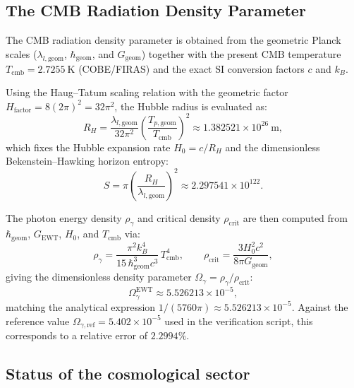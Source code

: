 \documentclass[10pt,a4paper]{article}
\begin{document}
\subsection{The CMB Radiation Density Parameter}
\label{sec:omega_gamma_cmb}

The CMB radiation density parameter is obtained from the geometric Planck scales ($\lambda_{l,\text{geom}}$, $\hbar_{\text{geom}}$, and $G_{\text{geom}}$) together with the present CMB temperature $T_{\text{cmb}} = 2.7255\ \text{K}$ (COBE/FIRAS) and the exact SI conversion factors $c$ and $k_B$.

Using the Haug--Tatum scaling relation with the geometric factor $H_{\text{factor}} = 8(2\pi)^2 = 32\pi^2$, the Hubble radius is evaluated as:
\begin{equation}
	R_H = \frac{\lambda_{l,\text{geom}}}{32\pi^2} \left(\frac{T_{p,\text{geom}}}{T_{\text{cmb}}}\right)^2 \approx 1.382521 \times 10^{26}\ \text{m},
	\label{eq:R_H_ewt}
\end{equation}
which fixes the Hubble expansion rate $H_0 = c / R_H$ and the dimensionless Bekenstein--Hawking horizon entropy:
\begin{equation}
	S = \pi \left(\frac{R_H}{\lambda_{l,\text{geom}}}\right)^2 \approx 2.297541 \times 10^{122}.
	\label{eq:S_hubble_ewt}
\end{equation}

The photon energy density $\rho_\gamma$ and critical density $\rho_{\text{crit}}$ are then computed from $\hbar_{\text{geom}}$, $G_{\text{EWT}}$, $H_0$, and $T_{\text{cmb}}$ via:
\begin{equation}
	\rho_\gamma = \frac{\pi^2 k_B^4}{15\,\hbar_{\text{geom}}^3 c^3}\,T_{\text{cmb}}^4,
	\qquad
	\rho_{\text{crit}} = \frac{3 H_0^2 c^2}{8\pi G_{\text{geom}}},
	\label{eq:rho_gamma_crit}
\end{equation}
giving the dimensionless density parameter $\Omega_\gamma = \rho_\gamma / \rho_{\text{crit}}$:
\begin{equation}
	\Omega_\gamma^{\text{EWT}} \approx 5.526213 \times 10^{-5},
	\label{eq:omega_gamma_computed}
\end{equation}
matching the analytical expression $1/(5760\pi) \approx 5.526213 \times 10^{-5}$. Against the reference value $\Omega_{\gamma,\text{ref}} = 5.402 \times 10^{-5}$ used in the verification script, this corresponds to a relative error of \(2.2994\%\).

\subsection{Status of the cosmological sector}
\label{sec:summary_status_table}
\end{document}
